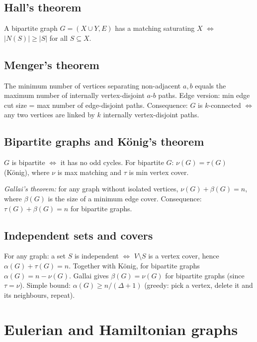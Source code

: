 \subsection{Hall's theorem}
\label{subsec:hall-graph}

A bipartite graph $G=(X\cup Y,E)$ has a matching saturating $X$ $\iff$ $|N(S)|\ge|S|$ for all $S\subseteq X$.

\subsection{Menger's theorem}
\label{subsec:menger}

The minimum number of vertices separating non-adjacent $a,b$ equals the maximum number of internally vertex-disjoint $a$-$b$ paths. Edge version: min edge cut size = max number of edge-disjoint paths. Consequence: $G$ is $k$-connected $\iff$ any two vertices are linked by $k$ internally vertex-disjoint paths.

\subsection{Bipartite graphs and K\"onig's theorem}
\label{subsec:bipartite}

$G$ is bipartite $\iff$ it has no odd cycles. For bipartite $G$: $\nu(G)=\tau(G)$ (K\"onig), where $\nu$ is max matching and $\tau$ is min vertex cover.

\textit{Gallai's theorem:} for any graph without isolated vertices, $\nu(G)+\beta(G)=n$, where $\beta(G)$ is the size of a minimum edge cover. Consequence: $\tau(G)+\beta(G)=n$ for bipartite graphs.

\subsection{Independent sets and covers}
\label{subsec:independence-covers}

For any graph: a set $S$ is independent $\iff$ $V\setminus S$ is a vertex cover, hence $\alpha(G)+\tau(G)=n$. Together with K\"onig, for bipartite graphs $\alpha(G)=n-\nu(G)$. Gallai gives $\beta(G)=\nu(G)$ for bipartite graphs (since $\tau=\nu$). Simple bound: $\alpha(G)\ge n/(\Delta+1)$ (greedy: pick a vertex, delete it and its neighbours, repeat).

\medskip

\section{Eulerian and Hamiltonian graphs}
\label{sec:eulerian-hamiltonian}

